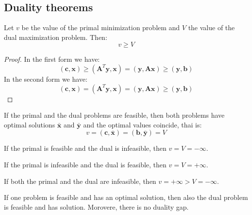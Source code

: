 \subsection{Duality theorems}
\begin{theorem}
    Let $v$ be the value of the primal minimization problem and $V$ the value of the dual maximization problem. 
    Then: 
    \[v\geq V\]
\end{theorem}
\begin{proof}
    In the first form we have: 
    \[(\mathbf{c},\mathbf{x})\geq(\mathbf{A}^T\mathbf{y},\mathbf{x})=(\mathbf{y},\mathbf{Ax})\geq(\mathbf{y},\mathbf{b})\]
    In the second form we have: 
    \[(\mathbf{c},\mathbf{x})=(\mathbf{A}^T\mathbf{y},\mathbf{x})=(\mathbf{y},\mathbf{Ax})\geq(\mathbf{y},\mathbf{b})\]
\end{proof}

\begin{theorem}
    If the primal and the dual problems are feasible, then both problems have optimal solutions $\bar{\mathbf{x}}$ and $\bar{\mathbf{y}}$ and the optimal values coincide, thai is: 
    \[v=(\mathbf{c},\bar{\mathbf{x}})=(\mathbf{b},\bar{\mathbf{y}})=V\]

    If the primal is feasible and the dual is infeasible, then $v=V=-\infty$. 

    If the primal is infeasible and the dual is feasible, then $v=V=+\infty$. 

    If both the primal and the dual are infeasible, then $v=+\infty>V=-\infty$.
\end{theorem}
\begin{corollary}
    If one problem is feasible and has an optimal solution, then also the dual problem is feasible and has solution. 
    Morovere, there is no duality gap. 
\end{corollary}

